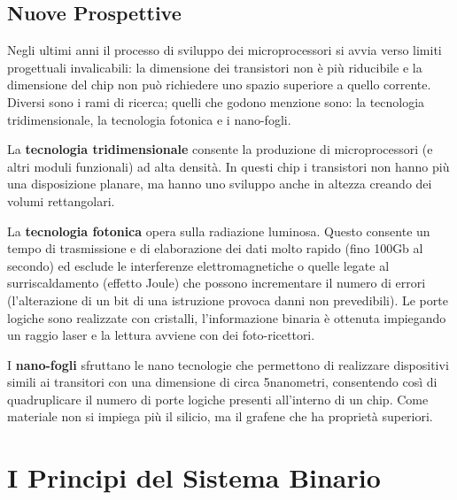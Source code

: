 \documentclass[12pt]{article} %
\begin{document}
\subsection{Nuove Prospettive}
Negli ultimi anni il processo di sviluppo dei microprocessori si avvia verso limiti progettuali invalicabili: la dimensione dei transistori non è più riducibile e la dimensione del chip non può richiedere uno spazio superiore a quello corrente. Diversi sono i rami di ricerca; quelli che godono menzione sono: la tecnologia tridimensionale, la tecnologia fotonica e i nano-fogli.\par\medskip\noindent
La \textbf{tecnologia tridimensionale} consente la produzione di microprocessori (e altri moduli funzionali) ad alta densità. In questi chip i transistori non hanno più una disposizione planare, ma hanno uno sviluppo anche in altezza creando dei volumi rettangolari.\par\medskip\noindent
La \textbf{tecnologia fotonica} opera sulla radiazione luminosa. Questo consente un tempo di trasmissione e di elaborazione dei dati molto rapido (fino 100Gb al secondo) ed esclude le interferenze elettromagnetiche o quelle legate al surriscaldamento (effetto Joule) che possono incrementare il numero di errori (l’alterazione di un bit di una istruzione provoca danni non prevedibili). Le porte logiche sono realizzate con cristalli, l’informazione binaria è ottenuta impiegando un raggio laser e la lettura avviene con dei foto-ricettori. \par\medskip\noindent
I \textbf{nano-fogli} sfruttano le nano tecnologie che permettono di realizzare dispositivi simili ai transitori con una dimensione di circa 5nanometri, consentendo così di quadruplicare il numero di porte logiche presenti all’interno di un chip. Come materiale non si impiega più il silicio, ma il grafene che ha proprietà superiori.\par\medskip\noindent
\newpage

\section{I Principi del Sistema Binario}
\end{document}

